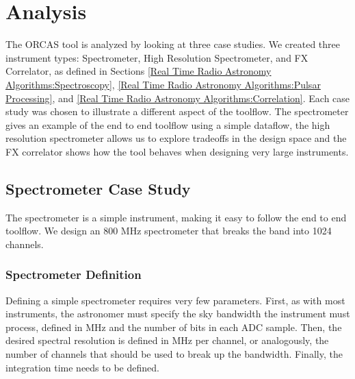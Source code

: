\chapter{Analysis} \label{chap:Analysis}

The ORCAS tool is analyzed by looking at three case studies. 
We created three instrument types: Spectrometer, High Resolution Spectrometer, and FX Correlator, as defined in Sections \ref{Real Time Radio Astronomy Algorithms:Spectroscopy}, \ref{Real Time Radio Astronomy Algorithms:Pulsar Processing}, and \ref{Real Time Radio Astronomy Algorithms:Correlation}. 
Each case study was chosen to illustrate a different aspect of the toolflow.
The spectrometer gives an example of the end to end toolflow using a simple dataflow, the high resolution spectrometer allows us to explore tradeoffs in the design space and the FX correlator shows how the tool behaves when designing very large instruments.






\section{Spectrometer Case Study}
The spectrometer is a simple instrument, making it easy to follow the end to end toolflow.
We design %
an 800 MHz spectrometer that breaks the band into 1024 channels.


\subsection{Spectrometer Definition}
Defining a simple spectrometer requires very few parameters. 
First, as with most instruments, the astronomer must specify the sky bandwidth the instrument must process, defined in MHz and the number of bits in each ADC sample.
Then, the desired spectral resolution is defined in MHz per channel, or analogously, the number of channels that should be used to break up the bandwidth.
Finally, the integration time needs to be defined.

